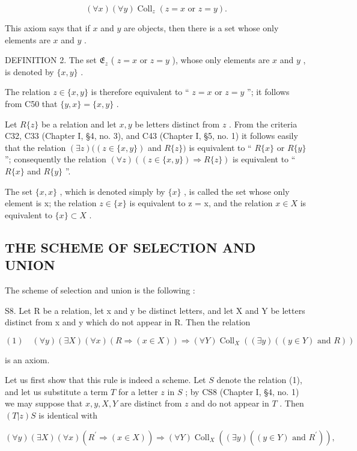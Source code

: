 \[
(\forall x) (\forall y) \operatorname{Coll} _ {z} (z = x \text {   or   } z = y).
\]

This axiom says that if \(x\) and \(y\) are objects, then there is a set whose only elements are \(x\) and \(y\) .

DEFINITION 2. The set \(\mathfrak{E}_z\) ( \(z = x\) or \(z = y\) ), whose only elements are \(x\) and \(y\) , is denoted by \(\{x, y\}\) .

The relation \(z \in \{x, y\}\) is therefore equivalent to `` \(z = x\) or \(z = y\) ''; it follows from C50 that \(\{y, x\} = \{x, y\}\) .

Let \(R\{z\}\) be a relation and let \(x, y\) be letters distinct from \(z\) . From the criteria C32, C33 (Chapter I, §4, no. 3), and C43 (Chapter I, §5, no. 1) it follows easily that the relation \((\exists z)((z \in \{x, y\})\) and \(R\{z\})\) is equivalent to `` \(R\{x\}\) or \(R\{y\}\) ''; consequently the relation \((\forall z)((z \in \{x, y\}) \Longrightarrow R\{z\})\) is equivalent to `` \(R\{x\}\) and \(R\{y\}\) ''.

The set \(\{x, x\}\) , which is denoted simply by \(\{x\}\) , is called the set whose only element is x; the relation \(z \in \{x\}\) is equivalent to z = x, and the relation \(x \in X\) is equivalent to \(\{x\} \subset X\) .

\subsection{THE SCHEME OF SELECTION AND UNION}

The scheme of selection and union is the following :

S8. Let R be a relation, let x and y be distinct letters, and let X and Y be letters distinct from x and y which do not appear in R. Then the relation

\[
(1) \quad (\forall y) (\exists X) (\forall x) (R \Longrightarrow (x \in X)) \Longrightarrow (\forall Y) \operatorname{Coll} _ {X} ((\exists y) ((y \in Y) \text {   and   } R))
\]

is an axiom.

Let us first show that this rule is indeed a scheme. Let \(S\) denote the relation (1), and let us substitute a term \(T\) for a letter \(z\) in \(S\) ; by CS8 (Chapter I, §4, no. 1) we may suppose that \(x, y, X, Y\) are distinct from \(z\) and do not appear in \(T\) . Then \((T|z)S\) is identical with

\[
(\forall y) (\exists X) (\forall x) (R ^ {\prime} \Longrightarrow (x \in X)) \Longrightarrow (\forall Y) \operatorname{Coll} _ {X} ((\exists y) ((y \in Y) \text {   and   } R ^ {\prime})),
\]

